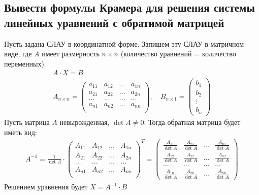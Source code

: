 \newpage
\subsection{Вывести формулы Крамера для решения системы линейных уравнений с обратимой матрицей}
Пусть задана СЛАУ в координатной форме. Запишем эту СЛАУ в матричном виде, где $A$ имеет размерность $n\times n$ (количество уравнений = количество переменных).
\begin{gather*}
A \cdot X = B\\ 
A_{n\times n} = \begin{pmatrix}
a_{11} & a_{12} & \ldots & a_{1n} \\
a_{21} & a_{22} & \ldots & a_{2n} \\
\ldots & \ldots & \ldots & \ldots \\
a_{n1} & a_{n2} & \ldots & a_{nn} \\
\end{pmatrix}, \quad B_{n\times 1} = \begin{pmatrix}
b_1\\
b_2\\
\vdots\\
b_n
\end{pmatrix}
\end{gather*}
Пусть матрица $A$ невырожденная, $\det A \ne 0$. Тогда обратная матрица будет иметь вид:
\begin{gather*}
A^{-1} = \frac{1}{\det A} \cdot \begin{pmatrix}
A_{11} & A_{12} & \ldots & A_{1n} \\
A_{21} & A_{22} & \ldots & A_{2n} \\
\ldots & \ldots & \ldots & \ldots \\
A_{n1} & A_{n2} & \ldots & A_{nn} \\
\end{pmatrix}^{T} = \begin{pmatrix}
\frac{A_{11}}{\det A} & \frac{A_{21}}{\det A} & \ldots & \frac{A_{n1}}{\det A} \\[1ex]
\frac{A_{12}}{\det A} & \frac{A_{22}}{\det A} & \ldots & \frac{A_{n2}}{\det A} \\[1ex]
\ldots & \ldots & \ldots & \ldots\\[1ex]
\frac{A_{1n}}{\det A} & \frac{A_{2n}}{\det A} & \ldots & \frac{A_{nn}}{\det A}
\end{pmatrix}
\end{gather*}
Решением уравнения будет $X = A^{-1} \cdot B$
